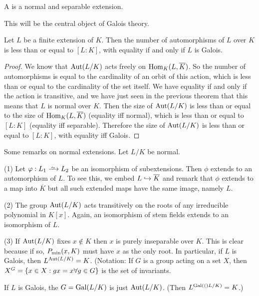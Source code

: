 \begin{dfn}
A  is a normal and separable extension.
\end{dfn}

This will be the central object of Galois theory.

\begin{thm}
Let $L$ be a finite extension of $K$. Then the number of automorphisms of $L$ over $K$ is less than or equal to $[L : K]$, with equality if and only if $L$ is Galois.
\end{thm}
\begin{proof}
We know that $\mathrm{Aut}(L/K)$ acts freely on $\mathrm{Hom}_{K}({L, \overline{K}})$.
So the number of automorphisms is equal to the cardinality of an orbit of this action, which is less than or equal to the cardinality of the set itself.
We have equality if and only if the action is transitive, and we have just seen in the previous theorem that this means that $L$ is normal over $K$.
Then the size of $\mathrm{Aut}(L/K)$ is less than or equal to the size of $\mathrm{Hom}_{K}({L, \overline{K}})$ (equality iff normal), which is less than or equal to $[L : K]$ (equality iff separable).
Therefore the size of $\mathrm{Aut}(L/K)$ is less than or equal to $[L : K]$, with equality iff Galois.
\end{proof}

\begin{rmk} 
Some remarks on normal extensions. 
Let $L / K$ be normal.

(1) Let $\phi: L_1 \isomap L_2$ be an isomorphism of subextensions.
Then $\phi$ extends to an automorphism of $L$.
To see this, we embed $L \hookrightarrow \overline{K}$ and remark that $\phi$ extends to a map into $\overline{K}$ but all such extended maps have the same image, namely $L$.

(2) The group $\mathrm{Aut}(L/K)$ acts transitively on the roots of any irreducible polynomial in $K[x]$.
Again, an isomorphism of stem fields extends to an isomorphism of $L$.

(3) If $\mathrm{Aut}(L/K)$ fixes $x \not\in K$ then $x$ is purely inseparable over $K$.
This is clear because if so, $P_{\mathrm{min}}(x, K)$ must have $x$ as the only root.
In particular, if $L$ is Galois, then $L^{\mathrm{Aut}(L/K)} = K$.
(Notation: If $G$ is a group acting on a set $X$, then $X^G = \left\{x \in X : gx = x \forall g \in G\right\}$ is the set of invariants.
\end{rmk}

\begin{dfn}
If $L$ is Galois, the  $G = \mathrm{Gal}(L/K)$ is just $\mathrm{Aut}(L/K)$.
(Then $L^{\mathrm{Gal}(()L/K)} = K$.)
\end{dfn}

